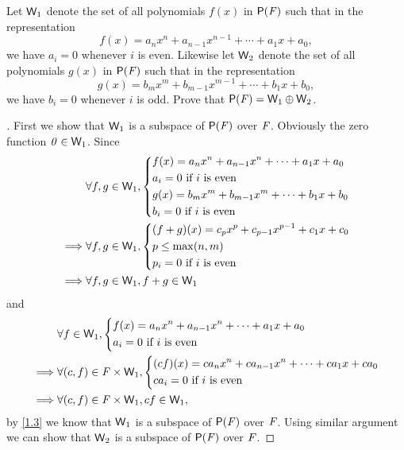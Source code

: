 \begin{ex}\label{ex:1.3.25}
  Let \(\mathsf{W}_1\) denote the set of all polynomials \(f(x)\) in \(\ps{\F}\) such that in the representation
  \[
    f(x) = a_n x^n + a_{n - 1} x^{n - 1} + \cdots + a_1 x + a_0,
  \]
  we have \(a_i = 0\) whenever \(i\) is even.
  Likewise let \(\mathsf{W}_2\) denote the set of all polynomials \(g(x)\) in \(\ps{\F}\) such that in the representation
  \[
    g(x) = b_m x^m + b_{m - 1} x^{m - 1} + \cdots + b_1 x + b_0,
  \]
  we have \(b_i = 0\) whenever \(i\) is odd.
  Prove that \(\ps{\F} = \W_1 \oplus \W_2\).
\end{ex}

\begin{proof}[]
  First we show that \(\mathsf{W}_1\) is a subspace of \(\ps{\F}\) over \(\mathit{F}\).
  Obviously the zero function \(\mathit{0} \in \mathsf{W}_1\).
  Since
  \begin{align*}
             & \forall f, g \in \mathsf{W}_1, \begin{dcases}
      f(x) = a_n x^n + a_{n - 1} x^n + \cdots + a_1 x + a_0 \\
      a_i = 0 \text{ if } i \text{ is even}                 \\
      g(x) = b_m x^m + b_{m - 1} x^m + \cdots + b_1 x + b_0 \\
      b_i = 0 \text{ if } i \text{ is even}
    \end{dcases} \\
    \implies & \forall f, g \in \mathsf{W}_1, \begin{dcases}
      (f + g)(x) = c_p x^p + c_{p - 1} x^{p - 1} + c_1 x + c_0 \\
      p \leq \max(n, m)                                        \\
      p_i = 0 \text{ if } i \text{ is even}
    \end{dcases} \\
    \implies & \forall f, g \in \mathsf{W}_1, f + g \in \mathsf{W}_1
  \end{align*}
  and
  \begin{align*}
             & \forall f \in \mathsf{W}_1, \begin{dcases}
      f(x) = a_n x^n + a_{n - 1} x^n + \cdots + a_1 x + a_0 \\
      a_i = 0 \text{ if } i \text{ is even}
    \end{dcases}                \\
    \implies & \forall (c, f) \in \mathit{F} \times \mathsf{W}_1, \begin{dcases}
      (cf)(x) = ca_n x^n + ca_{n - 1} x^n + \cdots + ca_1 x + ca_0 \\
      ca_i = 0 \text{ if } i \text{ is even}
    \end{dcases} \\
    \implies & \forall (c, f) \in \mathit{F} \times \mathsf{W}_1, cf \in \mathsf{W}_1,
  \end{align*}
  by \cref{1.3} we know that \(\mathsf{W}_1\) is a subspace of \(\ps{\F}\) over \(\mathit{F}\).
  Using similar argument we can show that \(\mathsf{W}_2\) is a subspace of \(\ps{\F}\) over \(\mathit{F}\).


\end{proof}
